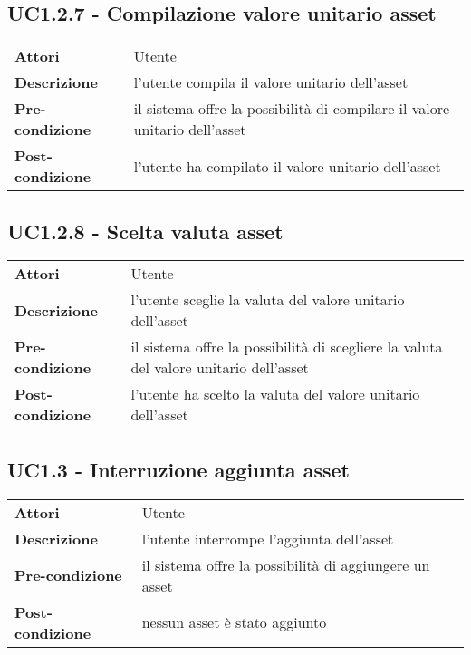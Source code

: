 \subsection{UC1.2.7 - Compilazione valore unitario asset}
\label{sssec:UC1.2.7}
\def\arraystretch{1.5}
\begin{tabularx}{\textwidth}{l|p{}}
\rowcolor{I} \multicolumn{2}{c}{\color{white}\textbf{UC1.2.7 - Compilazione valore unitario asset}} \\
\toprule
\endhead
\textbf{Attori} & Utente\\
\textbf{Descrizione} & l'utente compila il valore unitario dell'asset\\
\textbf{Pre-condizione} & il sistema offre la possibilità di compilare il valore unitario dell'asset\\
\textbf{Post-condizione} & l'utente ha compilato il valore unitario dell'asset\\
\bottomrule
\end{tabularx}
\subsection{UC1.2.8 - Scelta valuta asset}
\label{sssec:UC1.2.8}
\def\arraystretch{1.5}
\begin{tabularx}{\textwidth}{l|p{}}
\rowcolor{I} \multicolumn{2}{c}{\color{white}\textbf{UC1.2.8 - Scelta valuta asset}} \\
\toprule
\endhead
\textbf{Attori} & Utente\\
\textbf{Descrizione} & l'utente sceglie la valuta del valore unitario dell'asset\\
\textbf{Pre-condizione} & il sistema offre la possibilità di scegliere la valuta del valore unitario dell'asset\\
\textbf{Post-condizione} & l'utente ha scelto la valuta del valore unitario dell'asset\\
\bottomrule
\end{tabularx}
\subsection{UC1.3 - Interruzione aggiunta asset}
\label{sssec:UC1.3}
\def\arraystretch{1.5}
\begin{tabularx}{\textwidth}{l|p{}}
\rowcolor{I} \multicolumn{2}{c}{\color{white}\textbf{UC1.3 - Interruzione aggiunta asset}} \\
\toprule
\endhead
\textbf{Attori} & Utente\\
\textbf{Descrizione} & l'utente interrompe l'aggiunta dell'asset\\
\textbf{Pre-condizione} & il sistema offre la possibilità di aggiungere un asset\\
\textbf{Post-condizione} & nessun asset è stato aggiunto\\
\bottomrule
\end{tabularx}
